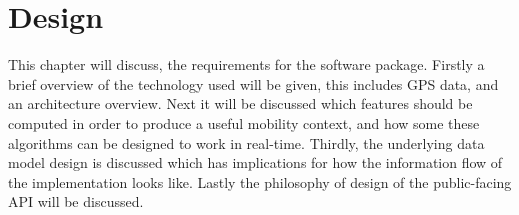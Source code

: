 \chapter{Design}
This chapter will discuss, the requirements for the software package. Firstly a brief overview of the technology used will be given, this includes GPS data, and an architecture overview. Next it will be discussed which features should be computed in order to produce a useful mobility context, and how some these algorithms can be designed to work in real-time. Thirdly, the underlying data model design is discussed which has implications for how the information flow of the implementation looks like. Lastly the philosophy of design of the public-facing API will be discussed.




